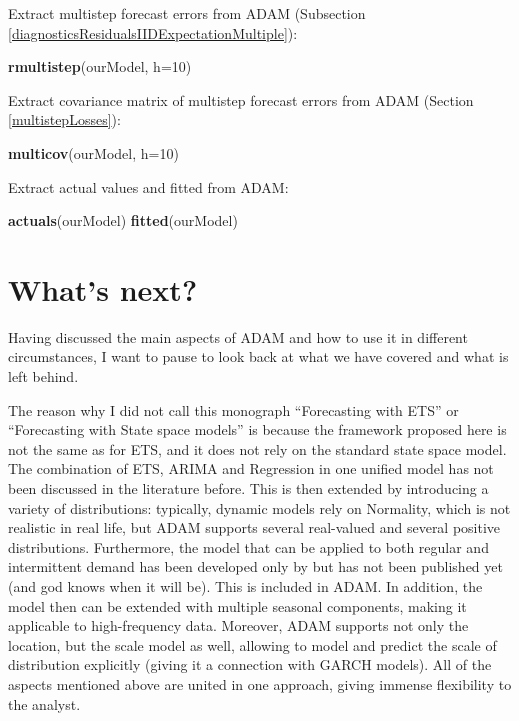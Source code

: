 \documentclass[]{book}
\newenvironment{Shaded}{\begin{snugshade}}{\end{snugshade}}
\newcommand{\DataTypeTok}[1]{\textcolor[rgb]{0.13,0.29,0.53}{#1}}
\newcommand{\DecValTok}[1]{\textcolor[rgb]{0.00,0.00,0.81}{#1}}
\newcommand{\KeywordTok}[1]{\textcolor[rgb]{0.13,0.29,0.53}{\textbf{#1}}}
\newcommand{\NormalTok}[1]{#1}
\theoremstyle{definition}
\theoremstyle{definition}
\theoremstyle{definition}
\theoremstyle{definition}
\theoremstyle{remark}
\begin{document}
Extract multistep forecast errors from ADAM (Subsection \ref{diagnosticsResidualsIIDExpectationMultiple}):

\begin{Shaded}
\begin{Highlighting}[]
\KeywordTok{rmultistep}\NormalTok{(ourModel, }\DataTypeTok{h=}\DecValTok{10}\NormalTok{)}
\end{Highlighting}
\end{Shaded}

Extract covariance matrix of multistep forecast errors from ADAM (Section \ref{multistepLosses}):

\begin{Shaded}
\begin{Highlighting}[]
\KeywordTok{multicov}\NormalTok{(ourModel, }\DataTypeTok{h=}\DecValTok{10}\NormalTok{)}
\end{Highlighting}
\end{Shaded}

Extract actual values and fitted from ADAM:

\begin{Shaded}
\begin{Highlighting}[]
\KeywordTok{actuals}\NormalTok{(ourModel)}
\KeywordTok{fitted}\NormalTok{(ourModel)}
\end{Highlighting}
\end{Shaded}

\hypertarget{conclusions}{%
\chapter{What's next?}\label{conclusions}}

Having discussed the main aspects of ADAM and how to use it in different circumstances, I want to pause to look back at what we have covered and what is left behind.

The reason why I did not call this monograph ``Forecasting with ETS'' or ``Forecasting with State space models'' is because the framework proposed here is not the same as for ETS, and it does not rely on the standard state space model. The combination of ETS, ARIMA and Regression in one unified model has not been discussed in the literature before. This is then extended by introducing a variety of distributions: typically, dynamic models rely on Normality, which is not realistic in real life, but ADAM supports several real-valued and several positive distributions. Furthermore, the model that can be applied to both regular and intermittent demand has been developed only by \citet{Svetunkov2019a} but has not been published yet (and god knows when it will be). This is included in ADAM. In addition, the model then can be extended with multiple seasonal components, making it applicable to high-frequency data. Moreover, ADAM supports not only the location, but the scale model as well, allowing to model and predict the scale of distribution explicitly (giving it a connection with GARCH models). All of the aspects mentioned above are united in one approach, giving immense flexibility to the analyst.
\end{document}
